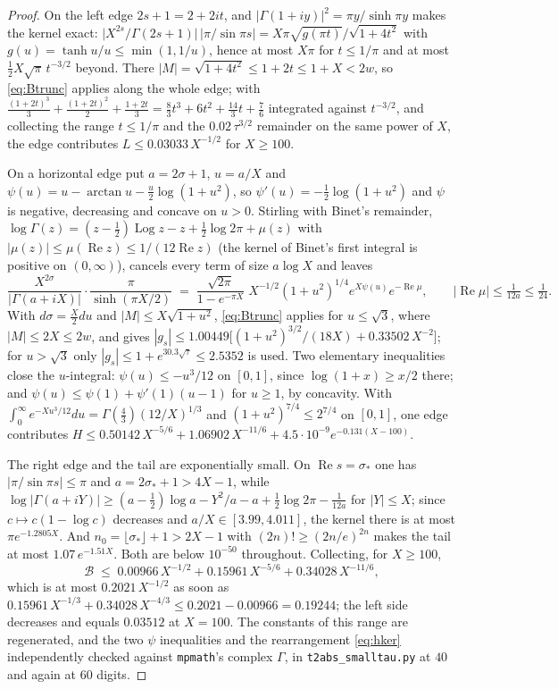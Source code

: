 \documentclass[11pt]{article}
\theoremstyle{plain}
\theoremstyle{definition}
\theoremstyle{remark}
\renewcommand{\Re}{\operatorname{Re}}
\begin{document}
\begin{proof}
On the left edge $2s+1=2+2it$, and $|\Gamma(1+iy)|^2=\pi y/\sinh\pi y$ makes the kernel exact:
$\bigl|X^{2s}/\Gamma(2s{+}1)\bigr|\,\bigl|\pi/\sin\pi s\bigr|=X\pi\sqrt{g(\pi t)}/\sqrt{1+4t^2}$
with $g(u)=\tanh u/u\le\min(1,1/u)$, hence at most $X\pi$ for $t\le1/\pi$ and at most
$\tfrac12X\sqrt\pi\,t^{-3/2}$ beyond. There $|M|=\sqrt{1+4t^2}\le1+2t\le1+X<2w$, so
\eqref{eq:Btrunc} applies along the whole edge; with
$\tfrac{(1+2t)^3}3+\tfrac{(1+2t)^2}2+\tfrac{1+2t}3=\tfrac83t^3+6t^2+\tfrac{14}3t+\tfrac76$
integrated against $t^{-3/2}$, and collecting the range $t\le1/\pi$ and the
$0.02\,\tau^{3/2}$ remainder on the same power of $X$, the edge contributes
$L\le0.03033\,X^{-1/2}$ for $X\ge100$.

On a horizontal edge put $a=2\sigma+1$, $u=a/X$ and
$\psi(u)=u-\arctan u-\tfrac u2\log(1+u^2)$, so $\psi'(u)=-\tfrac12\log(1+u^2)$ and $\psi$ is
negative, decreasing and concave on $u>0$. Stirling with Binet's remainder,
$\log\Gamma(z)=(z-\tfrac12)\operatorname{Log}z-z+\tfrac12\log2\pi+\mu(z)$ with
$|\mu(z)|\le\mu(\Re z)\le1/(12\Re z)$ (the kernel of Binet's first integral is positive on
$(0,\infty)$), cancels every term of size $a\log X$ and leaves
\begin{equation}\label{eq:hker}
   \frac{X^{2\sigma}}{|\Gamma(a+iX)|}\cdot\frac{\pi}{\sinh(\pi X/2)}
   \;=\;\frac{\sqrt{2\pi}}{1-e^{-\pi X}}\;X^{-1/2}(1+u^2)^{1/4}e^{X\psi(u)}e^{-\Re\mu},
   \qquad|\Re\mu|\le\tfrac1{12a}\le\tfrac1{24}.
\end{equation}
With $d\sigma=\tfrac X2du$ and $|M|\le X\sqrt{1+u^2}$, \eqref{eq:Btrunc} applies for $u\le\sqrt3$,
where $|M|\le2X\le2w$, and gives $|g_s|\le1.00449\bigl[(1+u^2)^{3/2}/(18X)+0.33502\,X^{-2}\bigr]$;
for $u>\sqrt3$ only $|g_s|\le1+e^{30.3\sqrt\tau}\le2.5352$ is used. Two elementary inequalities
close the $u$-integral: $\psi(u)\le-u^3/12$ on $[0,1]$, since $\log(1+x)\ge x/2$ there; and
$\psi(u)\le\psi(1)+\psi'(1)(u-1)$ for $u\ge1$, by concavity. With
$\int_0^\infty e^{-Xu^3/12}du=\Gamma(\tfrac43)(12/X)^{1/3}$ and $(1+u^2)^{7/4}\le2^{7/4}$ on
$[0,1]$, one edge contributes
$H\le0.50142\,X^{-5/6}+1.06902\,X^{-11/6}+4.5\cdot10^{-9}e^{-0.131(X-100)}$.

The right edge and the tail are exponentially small. On $\Re s=\sigma_\ast$ one has
$|\pi/\sin\pi s|\le\pi$ and $a=2\sigma_\ast+1>4X-1$, while
$\log|\Gamma(a+iY)|\ge(a-\tfrac12)\log a-Y^2/a-a+\tfrac12\log2\pi-\tfrac1{12a}$ for $|Y|\le X$;
since $c\mapsto c(1-\log c)$ decreases and $a/X\in[3.99,4.011]$, the kernel there is at most
$\pi e^{-1.2805X}$. And $n_0=\lfloor\sigma_\ast\rfloor+1>2X-1$ with $(2n)!\ge(2n/e)^{2n}$ makes the
tail at most $1.07\,e^{-1.51X}$. Both are below $10^{-50}$ throughout. Collecting, for $X\ge100$,
\[
   \mathcal B\;\le\;0.00966\,X^{-1/2}+0.15961\,X^{-5/6}+0.34028\,X^{-11/6},
\]
which is at most $0.2021\,X^{-1/2}$ as soon as
$0.15961\,X^{-1/3}+0.34028\,X^{-4/3}\le0.2021-0.00966=0.19244$; the left side decreases and
equals $0.03512$ at $X=100$. The constants of this range are regenerated, and the two $\psi$ inequalities and the
rearrangement \eqref{eq:hker} independently checked against \texttt{mpmath}'s complex $\Gamma$, in
\texttt{t2abs\_smalltau.py} at $40$ and again at $60$ digits.


\end{proof}
\end{document}
